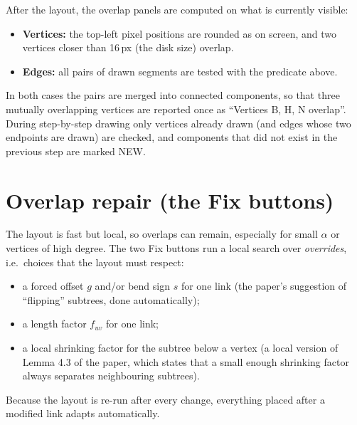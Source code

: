 \documentclass[11pt,a4paper]{article}
\begin{document}
After the layout, the overlap panels are computed on what is currently visible:
\begin{itemize}
  \item \textbf{Vertices:} the top-left pixel positions are rounded as on screen, and two vertices closer than 16\,px (the disk size) overlap.
  \item \textbf{Edges:} all pairs of drawn segments are tested with the predicate above.
\end{itemize}
In both cases the pairs are merged into connected components, so that three mutually overlapping vertices are reported once as ``Vertices B, H, N overlap''. During step-by-step drawing only vertices already drawn (and edges whose two endpoints are drawn) are checked, and components that did not exist in the previous step are marked NEW.

\section{Overlap repair (the Fix buttons)}
\label{sec:fix}

The layout is fast but local, so overlaps can remain, especially for small $\alpha$ or vertices of high degree. The two Fix buttons run a local search over \emph{overrides}, i.e.\ choices that the layout must respect:
\begin{itemize}
  \item a forced offset $g$ and/or bend sign $s$ for one link (the paper's suggestion of ``flipping'' subtrees, done automatically);
  \item a length factor $f_{uv}$ for one link;
  \item a local shrinking factor for the subtree below a vertex (a local version of Lemma 4.3 of the paper, which states that a small enough shrinking factor always separates neighbouring subtrees).
\end{itemize}
Because the layout is re-run after every change, everything placed after a modified link adapts automatically.
\end{document}
